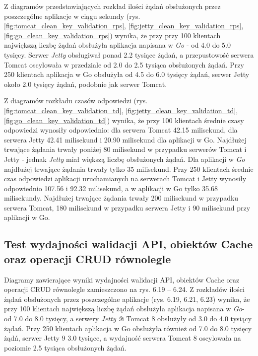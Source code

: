 Z diagramów przedstawiających rozkład ilości żądań obsłużonych przez poszczególne aplikacje w ciągu sekundy (rys. \ref{fig:tomcat_clean_key_validation_rps}, \ref{fig:jetty_clean_key_validation_rps}, \ref{fig:go_clean_key_validation_rps}) wynika, że przy przy 100 klientach największą liczbę żądań obsłużyła aplikacja napisana w \textsl{Go} - od 4.0 do 5.0 tysięcy. Serwer \textsl{Jetty} obsługiwał ponad 2.2 tysiące żądań, a przepustowość serwera Tomcat oscylowała w przedziale od 2.0 do 2.5 tysiąca obsłużonych żądań. Przy 250 klientach aplikacja w Go obsłużyła od 4.5 do 6.0 tysięcy żądań, serwer Jetty około 2.0 tysięcy żądań, podobnie jak serwer Tomcat.

Z diagramów rozkładu czasów odpowiedzi (rys. \ref{fig:tomcat_clean_key_validation_td}, \ref{fig:jetty_clean_key_validation_td}, \ref{fig:go_clean_key_validation_td}) wynika, że przy 100 klientach średnie czasy odpowiedzi wynosiły odpowiednio: dla serwera Tomcat 42.15  milisekund, dla serwera Jetty 42.41  milisekund i 20.90 milisekund dla aplikacji w Go.  Najdłużej trwające żądania trwały poniżej 80 milisekund w przypadku serwerów Tomcat i Jetty - jednak \textsl{Jetty} miał większą liczbę obsłużonych żądań. Dla aplikacji w \textsl{Go} najdłużej trwające żądania trwały tylko 35 milisekund. Przy 250 klientach średnie czas odpowiedzi aplikacji uruchamianych na serwerach Tomcat i Jetty  wynosiły  odpowiednio 107.56 i 92.32 milisekund, a w aplikacji w Go tylko 35.68 milisekundy. Najdłużej trwające żądania trwały 200 milisekund w przypadku serwera Tomcat, 180 milisekund w przypadku serwera Jetty i 90 milisekund przy aplikacji w Go. 


\clearpage

\subsection{Test wydajności walidacji API, obiektów Cache oraz operacji CRUD równolegle}
Diagramy zawierające wyniki wydajności walidacji API, obiektów Cache oraz operacji CRUD równolegle zamieszczono na rys. 6.19 – 6.24.                                                                                            
Z rozkładów ilości żądań obsłużonych  przez poszczególne aplikacje (rys. 6.19, 6.21, 6.23) wynika, że przy 100 klientach największą liczbę żądań  obsłużyła aplikacja napisana w \textsl{Go}- od 7.0 do 8.0 tysięcy, a serwery \textsl{Jetty 9}i Tomcat 8 obsłużyły od 3.0 do 4.0  tysiący żądań. Przy 250 klientach aplikacja w Go obsłużyła również od 7.0 do 8.0 tysięcy żądń, serwer Jetty 9 3.0 tysiące, a wydajność serwera Tomcat 8 oscylowała na poziomie 2.5 tysiąca obsłużonych żądań. 
 
